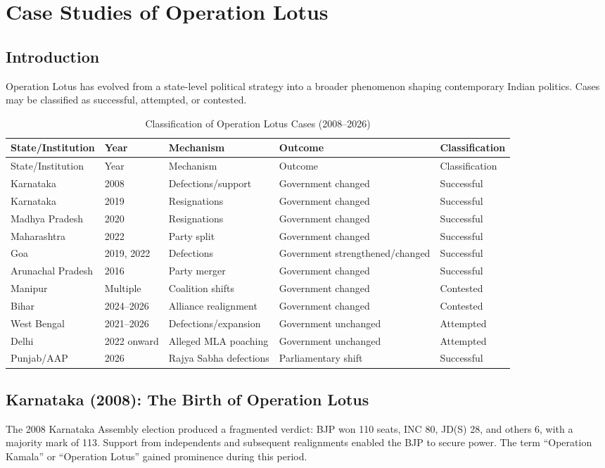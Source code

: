 \documentclass[11pt]{article}
\begin{document}
\section{Case Studies of Operation Lotus}
\subsection{Introduction}
Operation Lotus has evolved from a state-level political strategy into a broader phenomenon shaping contemporary Indian politics. Cases may be classified as successful, attempted, or contested.

\begin{longtable}{@{}p{}p{}p{}p{}p{}@{}}
\caption{Classification of Operation Lotus Cases (2008--2026)}\\
\toprule
State/Institution & Year & Mechanism & Outcome & Classification\\
\midrule
\endfirsthead
\toprule
State/Institution & Year & Mechanism & Outcome & Classification\\
\midrule
\endhead
Karnataka & 2008 & Defections/support & Government changed & Successful\\
Karnataka & 2019 & Resignations & Government changed & Successful\\
Madhya Pradesh & 2020 & Resignations & Government changed & Successful\\
Maharashtra & 2022 & Party split & Government changed & Successful\\
Goa & 2019, 2022 & Defections & Government strengthened/changed & Successful\\
Arunachal Pradesh & 2016 & Party merger & Government changed & Successful\\
Manipur & Multiple & Coalition shifts & Government changed & Contested\\
Bihar & 2024--2026 & Alliance realignment & Government changed & Contested\\
West Bengal & 2021--2026 & Defections/expansion & Government unchanged & Attempted\\
Delhi & 2022 onward & Alleged MLA poaching & Government unchanged & Attempted\\
Punjab/AAP & 2026 & Rajya Sabha defections & Parliamentary shift & Successful\\
\bottomrule
\end{longtable}

\subsection{Karnataka (2008): The Birth of Operation Lotus}
The 2008 Karnataka Assembly election produced a fragmented verdict: BJP won 110 seats, INC 80, JD(S) 28, and others 6, with a majority mark of 113. Support from independents and subsequent realignments enabled the BJP to secure power. The term ``Operation Kamala'' or ``Operation Lotus'' gained prominence during this period.
\end{document}
